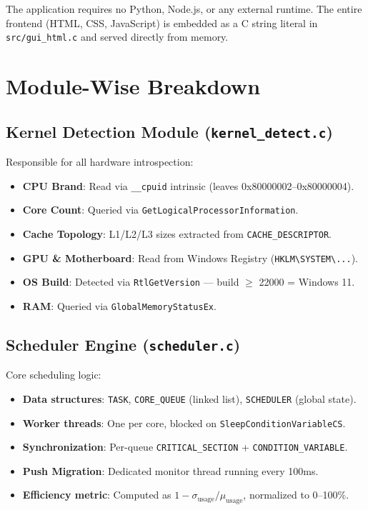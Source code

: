 \documentclass[12pt,a4paper]{article}
\begin{document}
The application requires no Python, Node.js, or any external runtime. The entire frontend (HTML, CSS, JavaScript) is embedded as a C string literal in \texttt{src/gui\_html.c} and served directly from memory.

\section{Module-Wise Breakdown}

\subsection{Kernel Detection Module (\texttt{kernel\_detect.c})}

Responsible for all hardware introspection:
\begin{itemize}
  \item \textbf{CPU Brand}: Read via \texttt{\_\_cpuid} intrinsic (leaves 0x80000002--0x80000004).
  \item \textbf{Core Count}: Queried via \texttt{GetLogicalProcessorInformation}.
  \item \textbf{Cache Topology}: L1/L2/L3 sizes extracted from \texttt{CACHE\_DESCRIPTOR}.
  \item \textbf{GPU \& Motherboard}: Read from Windows Registry (\texttt{HKLM\textbackslash{}SYSTEM\textbackslash{}...}).
  \item \textbf{OS Build}: Detected via \texttt{RtlGetVersion} — build $\geq$ 22000 = Windows 11.
  \item \textbf{RAM}: Queried via \texttt{GlobalMemoryStatusEx}.
\end{itemize}

\subsection{Scheduler Engine (\texttt{scheduler.c})}

Core scheduling logic:
\begin{itemize}
  \item \textbf{Data structures}: \texttt{TASK}, \texttt{CORE\_QUEUE} (linked list), \texttt{SCHEDULER} (global state).
  \item \textbf{Worker threads}: One per core, blocked on \texttt{SleepConditionVariableCS}.
  \item \textbf{Synchronization}: Per-queue \texttt{CRITICAL\_SECTION} + \texttt{CONDITION\_VARIABLE}.
  \item \textbf{Push Migration}: Dedicated monitor thread running every 100ms.
  \item \textbf{Efficiency metric}: Computed as $1 - \sigma_{\text{usage}} / \mu_{\text{usage}}$, normalized to 0--100\%.
\end{itemize}
\end{document}
